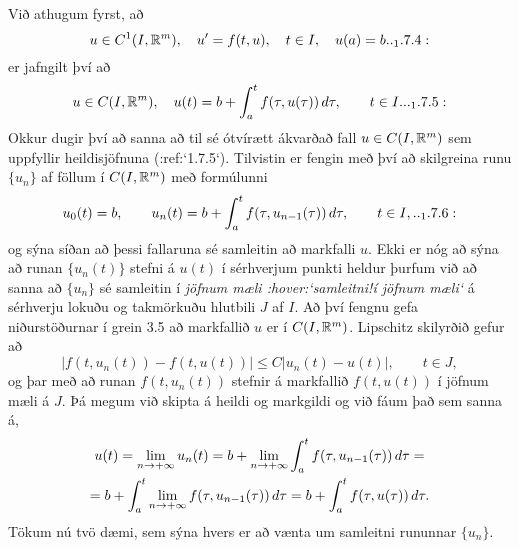  Við athugum fyrst, að 
\begin{equation*}u\in C\sp 1(I,\R\sp m), \quad u\dash=f(t,u),\quad t\in I, \quad
u(a)=b 

.. _1.7.4:

 \end{equation*}
er jafngilt því að
 \begin{equation*}
u\in C(I,\R\sp m),\quad 
u(t)=b+\int_a\sp t f(\tau,u(\tau))\, d\tau, \qquad t\in I.

.. _1.7.5:
 
 \end{equation*}
Okkur dugir því að sanna að til sé ótvírætt ákvarðað fall $u\in
C(I,{\mathbb R}\sp m)$ sem uppfyllir heildisjöfnuna (:ref:`1.7.5`). 
Tilvistin er fengin með því að skilgreina runu $\{ u_n\}$ af föllum í
$C(I,{\mathbb R}\sp m)$ með formúlunni
 \begin{equation*}u_0(t)=b, \qquad 
u_n(t)=b+\int_a\sp t f(\tau,u_{n-1}(\tau))\, d\tau, \qquad t\in
I,

.. _1.7.6:
 
 \end{equation*}
og sýna síðan að þessi fallaruna sé samleitin að markfalli $u$.
Ekki er nóg að sýna að runan $\{u_n(t)\}$ stefni á $u(t)$  í sérhverjum
punkti heldur þurfum við að sanna að $\{u_n\}$ sé samleitin í
{\it jöfnum mæli :hover:`samleitni!í jöfnum mæli`} 
á sérhverju lokuðu og takmörkuðu hlutbili $J$ af
$I$.  Að því fengnu gefa niðurstöðurnar í grein 3.5 að 
markfallið $u$ er í $C(I,{\mathbb R}\sp m)$. 
Lipschitz skilyrðið gefur að 
 $$|f(t,u_n(t))-f(t,u(t))|\leq C|u_n(t)-u(t)|, \qquad t\in J,
 $$
og þar með að runan $f(t,u_n(t))$ stefnir á markfallið $f(t,u(t))$
í jöfnum mæli á $J$.  Þá  megum við skipta á heildi og markgildi og
við fáum það sem sanna á,
\begin{multline*}
u(t)= \lim\limits_{n\to +\infty} u_n(t) =
b+\lim\limits_{n\to +\infty} \int_a\sp t f(\tau,u_{n-1}(\tau)) \, d\tau =\\
=
b+\int_a\sp t \lim\limits_{n\to +\infty} f(\tau,u_{n-1}(\tau)) \, d\tau =
b+ \int_a\sp t f(\tau,u(\tau)) \, d\tau.
\end{multline*}
Tökum nú tvö dæmi, sem sýna hvers er að vænta um
samleitni rununnar $\{u_n\}$. 